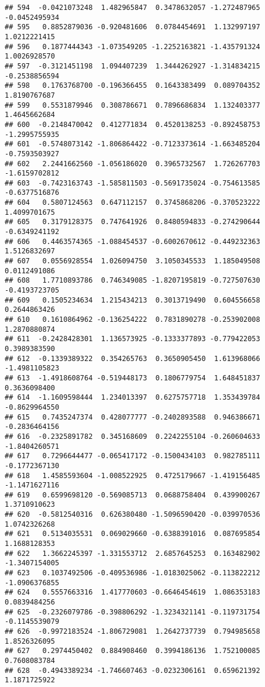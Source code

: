 \documentclass[
]{article}
\begin{document}
\begin{verbatim}
## 594  -0.0421073248  1.482965847  0.3478632057 -1.272487965 -0.0452495934
## 595   0.8852879036 -0.920481606  0.0784454691  1.132997197  1.0212221415
## 596   0.1877444343 -1.073549205 -1.2252163821 -1.435791324  1.0026928570
## 597  -0.3121451198  1.094407239  1.3444262927 -1.314834215 -0.2538856594
## 598   0.1763768700 -0.196366455  0.1643383499  0.089704352  1.8190767687
## 599   0.5531879946  0.308786671  0.7896686834  1.132403377  1.4645662684
## 600  -0.2148470042  0.412771834  0.4520138253 -0.892458753 -1.2995755935
## 601  -0.5748073142 -1.806864422 -0.7123373614 -1.663485204 -0.7593503927
## 602   2.2441662560 -1.056186020  0.3965732567  1.726267703 -1.6159702812
## 603  -0.7423163743 -1.585811503 -0.5691735024 -0.754613585 -0.6377516876
## 604   0.5807124563  0.647112157  0.3745868206 -0.370523222  1.4099701675
## 605   0.3179128375  0.747641926  0.8480594833 -0.274290644 -0.6349241192
## 606   0.4463574365 -1.088454537 -0.6002670612 -0.449232363  1.5126832697
## 607   0.0556928554  1.026094750  3.1050345533  1.185049508  0.0112491086
## 608   1.7710893786  0.746349085 -1.8207195819 -0.727507630 -0.4193723705
## 609   0.1505234634  1.215434213  0.3013719490  0.604556658  0.2644863426
## 610   0.1610864962 -0.136254222  0.7831890278 -0.253902008  1.2870880874
## 611  -0.2428428301  1.136573925 -0.1333377893 -0.779422053  0.3989383590
## 612  -0.1339389322  0.354265763  0.3650905450  1.613968066 -1.4981105823
## 613  -1.4918608764 -0.519448173  0.1806779754  1.648451837  0.3636098400
## 614  -1.1609598444  1.234013397  0.6275757718  1.353439784 -0.8629964550
## 615   0.7435247374  0.428077777 -0.2402893588  0.946386671 -0.2836464156
## 616  -0.2325891782  0.345168609  0.2242255104 -0.260604633 -1.8404260571
## 617   0.7296644477 -0.065417172 -0.1500434103  0.982785111 -0.1772367130
## 618   1.4585593604 -1.008522925  0.4725179667 -1.419156485 -1.1471627116
## 619   0.6599698120 -0.569085713  0.0688758404  0.439900267  1.3710910623
## 620  -0.5812540316  0.626380480 -1.5096590420 -0.039970536  1.0742326268
## 621   0.5134035531  0.069029660 -0.6388391016  0.087695854  1.1688128353
## 622   1.3662245397 -1.331553712  2.6857645253  0.163482902 -1.3407154005
## 623   0.1037492506 -0.409536986 -1.0183025062 -0.113822212 -1.0906376855
## 624   0.5557663316  1.417770603 -0.6646454619  1.086353183  0.0839484256
## 625  -0.2326079786 -0.398806292 -1.3234321141 -0.119731754 -0.1145539079
## 626  -0.9972183524 -1.806729081  1.2642737739  0.794985658  1.8526326095
## 627   0.2974450402  0.884908460  0.3994186136  1.752100085  0.7608083784
## 628  -0.4943389234 -1.746607463 -0.0232306161  0.659621392  1.1871725922

\end{verbatim}
\end{document}
